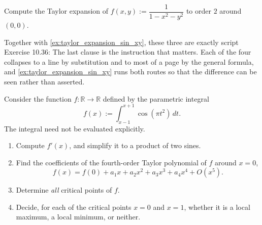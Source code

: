 \begin{exercise}
\label{ex:taylor_expansion_one_over_1_minus_x2_y2}
Compute the Taylor expansion of $f(x,y) := \dfrac{1}{1-x^2-y^2}$ to order $2$ around $(0,0)$.
\end{exercise}

\begin{remark}
Together with \cref{ex:taylor_expansion_sin_xy}, these three are exactly script Exercise 10.36:
 The last clause is the
instruction that matters. Each of the four collapses to a line by substitution and to most of a
page by the general formula, and \cref{ex:taylor_expansion_sin_xy} runs both routes so that the
difference can be seen rather than asserted.
\end{remark}

\begin{exercise}
\label{ex:taylor_parametric_integral}
Consider the function $f : \mathbb{R} \to \mathbb{R}$ defined by the parametric integral
\[f(x) := \int_{x-1}^{x+1} \cos(\pi t^2) \, dt.\]
The integral need not be evaluated explicitly.
\begin{enumerate}[label=\textbf{(\alph*)}]
  \item Compute $f'(x)$, and simplify it to a product of two sines.
  \item Find the coefficients of the fourth-order Taylor polynomial of $f$ around $x = 0$,
  \[f(x) = f(0) + a_1 x + a_2 x^2 + a_3 x^3 + a_4 x^4 + O(x^5).\]
  \item Determine \emph{all} critical points of $f$.
  \item Decide, for each of the critical points $x = 0$ and $x = 1$, whether it is a local maximum,
    a local minimum, or neither.
\end{enumerate}
\end{exercise}


